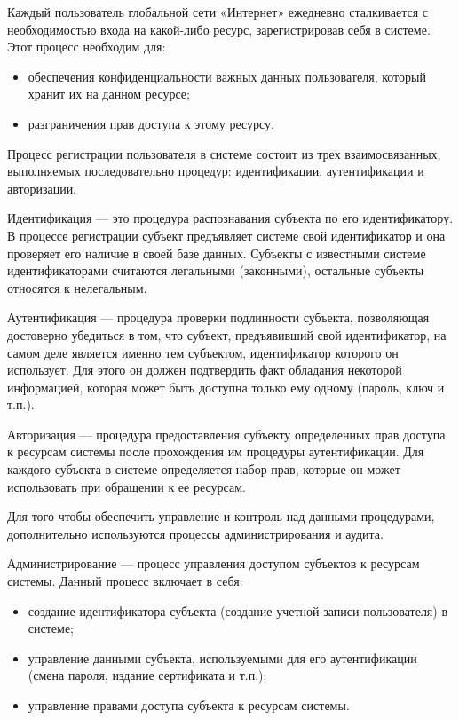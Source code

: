 \intro

Каждый пользователь глобальной сети «Интернет» ежедневно сталкивается с
необходимостью входа на какой-либо ресурс, зарегистрировав себя в системе. Этот
процесс необходим для:
\begin{itemize}
  \item обеспечения конфиденциальности важных данных пользователя, который
  хранит их на данном ресурсе;
\item разграничения прав доступа к этому ресурсу.
\end{itemize}

Процесс регистрации пользователя в системе состоит из трех взаимосвязанных,
выполняемых последовательно процедур: идентификации, аутентификации и
авторизации.

Идентификация --- это процедура распознавания субъекта по его идентификатору. В
процессе регистрации субъект предъявляет системе свой идентификатор и она
проверяет его наличие в своей базе данных. Субъекты с известными системе
идентификаторами считаются легальными (законными), остальные субъекты относятся
к нелегальным.

Аутентификация --- процедура проверки подлинности субъекта, позволяющая
достоверно убедиться в том, что субъект, предъявивший свой идентификатор, на
самом деле является именно тем субъектом, идентификатор которого он использует.
Для этого он должен подтвердить факт обладания некоторой информацией, которая
может быть доступна только ему одному (пароль, ключ и т.п.).

Авторизация --- процедура предоставления субъекту определенных прав доступа к
ресурсам системы после прохождения им процедуры аутентификации. Для каждого
субъекта в системе определяется набор прав, которые он может использовать при
обращении к ее ресурсам.

Для того чтобы обеспечить управление и контроль над данными процедурами,
дополнительно используются процессы администрирования и аудита.

Администрирование --- процесс управления доступом субъектов к ресурсам системы.
Данный процесс включает в себя:
\begin{itemize}
  \item создание идентификатора субъекта (создание учетной записи пользователя) в
системе;
\item управление данными субъекта, используемыми для его аутентификации
(смена пароля, издание сертификата и т.п.);
\item управление правами доступа
субъекта к ресурсам системы.
\end{itemize}

